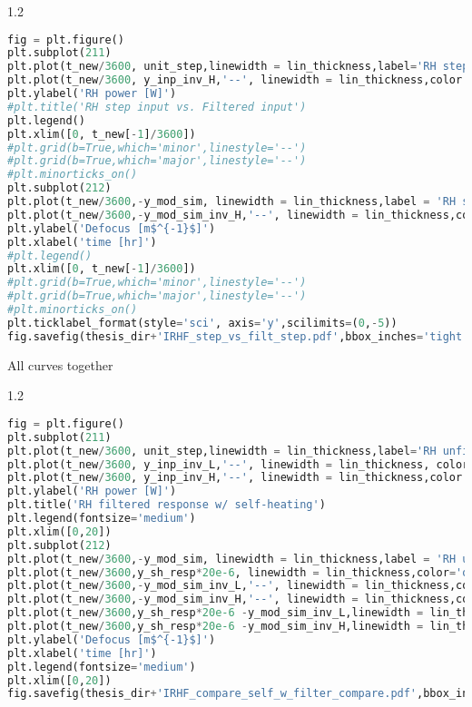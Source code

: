\begin{spacing}{1.2} \begin{lstlisting}[frame=single,language=Python]
fig = plt.figure()
plt.subplot(211)
plt.plot(t_new/3600, unit_step,linewidth = lin_thickness,label='RH step input')
plt.plot(t_new/3600, y_inp_inv_H,'--', linewidth = lin_thickness,color = 'red', label='RH filtered input')
plt.ylabel('RH power [W]')
#plt.title('RH step input vs. Filtered input')
plt.legend()
plt.xlim([0, t_new[-1]/3600])
#plt.grid(b=True,which='minor',linestyle='--')
#plt.grid(b=True,which='major',linestyle='--')
#plt.minorticks_on()
plt.subplot(212)
plt.plot(t_new/3600,-y_mod_sim, linewidth = lin_thickness,label = 'RH step input')
plt.plot(t_new/3600,-y_mod_sim_inv_H,'--', linewidth = lin_thickness,color='red',label ='RH filtered input')
plt.ylabel('Defocus [m$^{-1}$]')
plt.xlabel('time [hr]')
#plt.legend()
plt.xlim([0, t_new[-1]/3600])
#plt.grid(b=True,which='minor',linestyle='--')
#plt.grid(b=True,which='major',linestyle='--')
#plt.minorticks_on()
plt.ticklabel_format(style='sci', axis='y',scilimits=(0,-5))
fig.savefig(thesis_dir+'IRHF_step_vs_filt_step.pdf',bbox_inches='tight')
\end{lstlisting} \end{spacing}



\noindent All curves together

\begin{spacing}{1.2} \begin{lstlisting}[frame=single,language=Python]
fig = plt.figure()
plt.subplot(211)
plt.plot(t_new/3600, unit_step,linewidth = lin_thickness,label='RH unfiltered step input')
plt.plot(t_new/3600, y_inp_inv_L,'--', linewidth = lin_thickness, color = 'green',label='RH conditioned input (G$_{1}$(s))')
plt.plot(t_new/3600, y_inp_inv_H,'--', linewidth = lin_thickness,color = 'red', label='RH conditioned input (G$_{2}$(s)')
plt.ylabel('RH power [W]')
plt.title('RH filtered response w/ self-heating')
plt.legend(fontsize='medium')
plt.xlim([0,20])
plt.subplot(212)
plt.plot(t_new/3600,-y_mod_sim, linewidth = lin_thickness,label = 'RH unfiltered step input')
plt.plot(t_new/3600,y_sh_resp*20e-6, linewidth = lin_thickness,color='orange',label ='self heating')
plt.plot(t_new/3600,-y_mod_sim_inv_L,'--', linewidth = lin_thickness,color='green',label ='RH conditioned input (G$_{1}$(s))')
plt.plot(t_new/3600,-y_mod_sim_inv_H,'--', linewidth = lin_thickness,color='red',label ='RH conditioned input (G$_{2}$(s)')
plt.plot(t_new/3600,y_sh_resp*20e-6 -y_mod_sim_inv_L,linewidth = lin_thickness,label='self heating + RH conditioned input (G$_{1}$(s)',color='purple')
plt.plot(t_new/3600,y_sh_resp*20e-6 -y_mod_sim_inv_H,linewidth = lin_thickness,label='self heating + RH conditioned input (G$_{2}$(s))',color='magenta')
plt.ylabel('Defocus [m$^{-1}$]')
plt.xlabel('time [hr]')
plt.legend(fontsize='medium')
plt.xlim([0,20])
fig.savefig(thesis_dir+'IRHF_compare_self_w_filter_compare.pdf',bbox_inches='tight')
\end{lstlisting} \end{spacing}


